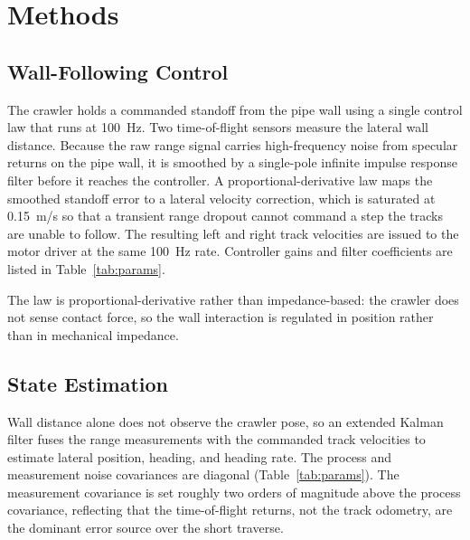 \section{Methods}

\subsection{Wall-Following Control}

The crawler holds a commanded standoff from the pipe wall using a single control law
that runs at 100~Hz. Two time-of-flight sensors measure the lateral wall distance.
Because the raw range signal carries high-frequency noise from specular returns on the
pipe wall, it is smoothed by a single-pole infinite impulse response filter before it
reaches the controller. A proportional-derivative law maps the smoothed standoff error
to a lateral velocity correction, which is saturated at 0.15~m/s so that a transient
range dropout cannot command a step the tracks are unable to follow. The resulting
left and right track velocities are issued to the motor driver at the same 100~Hz
rate. Controller gains and filter coefficients are listed in Table~\ref{tab:params}.

The law is proportional-derivative rather than impedance-based: the crawler does not
sense contact force, so the wall interaction is regulated in position rather than in
mechanical impedance.

\subsection{State Estimation}

Wall distance alone does not observe the crawler pose, so an extended Kalman filter
fuses the range measurements with the commanded track velocities to estimate lateral
position, heading, and heading rate. The process and measurement noise covariances are
diagonal (Table~\ref{tab:params}). The measurement covariance is set roughly two orders
of magnitude above the process covariance, reflecting that the time-of-flight returns,
not the track odometry, are the dominant error source over the short traverse.

